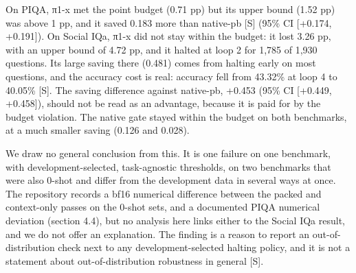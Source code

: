 \begin{table}[t]
\centering\small
\caption{Out-of-distribution TEST results with one task-agnostic \((\tau, m)\) per policy {[}S{]}. Bold marks losses and upper bounds above 1 pp.~The B\_pb row is full depth.}
\end{table}

On PIQA, π1-x met the point budget (0.71 pp) but its upper bound (1.52 pp) was above 1 pp, and it saved 0.183 more than native-pb {[}S{]} (95\% CI {[}+0.174, +0.191{]}). On Social IQa, π1-x did not stay within the budget: it lost 3.26 pp, with an upper bound of 4.72 pp, and it halted at loop 2 for 1,785 of 1,930 questions. Its large saving there (0.481) comes from halting early on most questions, and the accuracy cost is real: accuracy fell from 43.32\% at loop 4 to 40.05\% {[}S{]}. The saving difference against native-pb, +0.453 (95\% CI {[}+0.449, +0.458{]}), should not be read as an advantage, because it is paid for by the budget violation. The native gate stayed within the budget on both benchmarks, at a much smaller saving (0.126 and 0.028).

We draw no general conclusion from this. It is one failure on one benchmark, with development-selected, task-agnostic thresholds, on two benchmarks that were also 0-shot and differ from the development data in several ways at once. The repository records a bf16 numerical difference between the packed and context-only passes on the 0-shot sets, and a documented PIQA numerical deviation (section 4.4), but no analysis here links either to the Social IQa result, and we do not offer an explanation. The finding is a reason to report an out-of-distribution check next to any development-selected halting policy, and it is not a statement about out-of-distribution robustness in general {[}S{]}.

